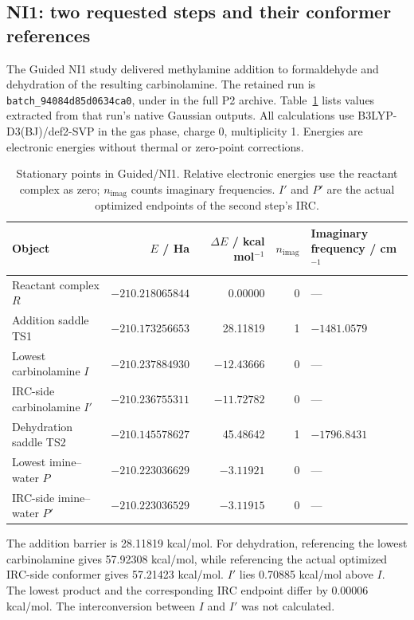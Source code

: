 \subsection{NI1: two requested steps and their conformer references}
\label{sec:si-ni1-chemical-objects}

The Guided NI1 study delivered methylamine addition to formaldehyde and dehydration of the resulting carbinolamine. The retained run is \texttt{batch\_94084d85d0634ca0}, under  in the full P2 archive. Table~\ref{tab:si-ni1-energies} lists values extracted from that run's native Gaussian outputs. All calculations use B3LYP-D3(BJ)/def2-SVP in the gas phase, charge 0, multiplicity 1. Energies are electronic energies without thermal or zero-point corrections.

\begin{table}[!htbp]
\centering\small
\caption{Stationary points in Guided/NI1. Relative electronic energies use the reactant complex as zero; $n_{\mathrm{imag}}$ counts imaginary frequencies. $I'$ and $P'$ are the actual optimized endpoints of the second step's IRC.}
\label{tab:si-ni1-energies}
\begin{tabular}{lrrrl}
\toprule
Object & $E$ / Ha & $\Delta E$ / kcal mol$^{-1}$ & $n_{\mathrm{imag}}$ & Imaginary frequency / cm$^{-1}$ \\
\midrule
Reactant complex $R$ & $-210.218065844$ & 0.00000 & 0 & --- \\
Addition saddle TS1 & $-210.173256653$ & 28.11819 & 1 & $-1481.0579$ \\
Lowest carbinolamine $I$ & $-210.237884930$ & $-12.43666$ & 0 & --- \\
IRC-side carbinolamine $I'$ & $-210.236755311$ & $-11.72782$ & 0 & --- \\
Dehydration saddle TS2 & $-210.145578627$ & 45.48642 & 1 & $-1796.8431$ \\
Lowest imine--water $P$ & $-210.223036629$ & $-3.11921$ & 0 & --- \\
IRC-side imine--water $P'$ & $-210.223036529$ & $-3.11915$ & 0 & --- \\
\bottomrule
\end{tabular}
\end{table}

The addition barrier is 28.11819 kcal/mol. For dehydration, referencing the lowest carbinolamine gives 57.92308 kcal/mol, while referencing the actual optimized IRC-side conformer gives 57.21423 kcal/mol. $I'$ lies 0.70885 kcal/mol above $I$. The lowest product and the corresponding IRC endpoint differ by 0.00006 kcal/mol. The interconversion between $I$ and $I'$ was not calculated.

